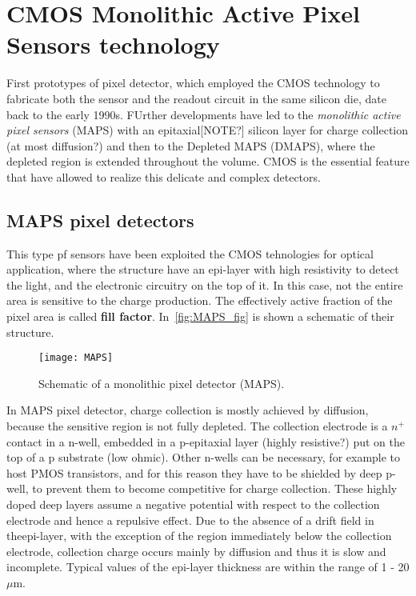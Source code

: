 \section{CMOS Monolithic Active Pixel Sensors technology} \label{sec:MAPS}
 
First prototypes of pixel detector, which employed the CMOS technology to fabricate both the sensor and the readout circuit in the same silicon die, date back to the early 1990s. FUrther developments have led to the \emph{monolithic active pixel sensors} (MAPS) with an epitaxial[NOTE?] silicon layer for charge collection (at most diffusion?) and then to the Depleted MAPS (DMAPS), where the depleted region is extended throughout the volume. CMOS is the essential feature that have allowed to realize this delicate and complex detectors.

\subsection{MAPS pixel detectors}

This type pf sensors have been exploited the CMOS tehnologies for optical application, where the structure have an epi-layer with high resistivity to detect the light, and the electronic circuitry on the top of it. In this case, not the entire area is sensitive to the charge production. The effectively active fraction of the pixel area is called \textbf{fill factor}. 
In~\autoref{fig:MAPS_fig} is shown a schematic of their structure. 

\begin{figure}[h!]
\centering
\texttt{[image: MAPS]}
\caption{Schematic of a monolithic pixel detector (MAPS).}
\label{fig:MAPS_fig}
\end{figure}

In MAPS pixel detector, charge collection is mostly achieved by diffusion, because the sensitive region is not fully depleted. The collection electrode is a $n^{+}$ contact in a n-well, embedded in a p-epitaxial layer (highly resistive?) put on the top of a p substrate (low ohmic). Other n-wells can be necessary, for example to host PMOS transistors, and for this reason they have to be shielded by deep p-well, to prevent them to become competitive for charge collection. These highly doped deep layers assume a negative potential with respect to the collection electrode and hence a repulsive effect.
Due to the absence of a drift field in theepi-layer, with the exception of the region immediately below the collection electrode, collection charge occurs mainly by diffusion and thus it is slow and incomplete. 
Typical values of the epi-layer thickness are within the range of 1 - 20 $\mu$m.


